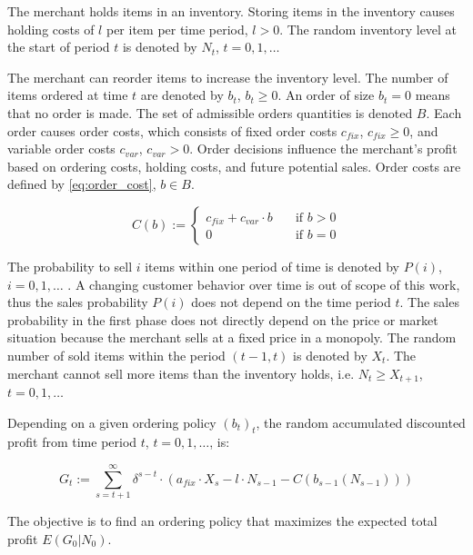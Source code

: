 The merchant holds items in an inventory.
Storing items in the inventory causes holding costs of $l$ per item per time period, $l > 0$.
The random inventory level at the start of period $t$ is denoted by $N_t$, $t = 0, 1, \ldots$

The merchant can reorder items to increase the inventory level.
The number of items ordered at time $t$ are denoted by $b_t$, $b_t \geq 0$.
An order of size $b_t = 0$ means that no order is made.
The set of admissible orders quantities is denoted $B$.
Each order causes order costs, which consists of fixed order costs $c_{fix}$, $c_{fix} \geq 0$, and variable order costs $c_{var}$, $c_{var} > 0$.
Order decisions influence the merchant's profit based on ordering costs, holding costs, and future potential sales.
Order costs are defined by \cref{eq:order_cost}, $b \in B$.

\begin{equation}
\label{eq:order_cost}
C(b) := \begin{cases}
	c_{fix} + c_{var} \cdot b  & \quad \text{if } b > 0 \\
	0  & \quad \text{if } b = 0
\end{cases}
\end{equation}

The probability to sell $i$ items within one period of time is denoted by $P(i)$, $i = 0, 1, \ldots$ .
A changing customer behavior over time is out of scope of this work, thus the sales probability $P(i)$ does not depend on the time period $t$.
The sales probability in the first phase does not directly depend on the price or market situation because the merchant sells at a fixed price in a monopoly.
The random number of sold items within the period $(t-1, t)$ is denoted by $X_t$.
The merchant cannot sell more items than the inventory holds, i.e. $N_t \geq X_{t+1}$, $t = 0, 1, \ldots$

Depending on a given ordering policy $(b_t)_t$, the random accumulated discounted profit from time period $t$, $t = 0, 1, \ldots$, is:

$$
G_t := \sum_{s=t+1}^{\infty} \delta^{s-t} \cdot (a_{fix} \cdot X_s - l \cdot N_{s-1} - C(b_{s-1}(N_{s-1})))
$$

The objective is to find an ordering policy that maximizes the expected total profit $E(G_0 | N_0)$.


